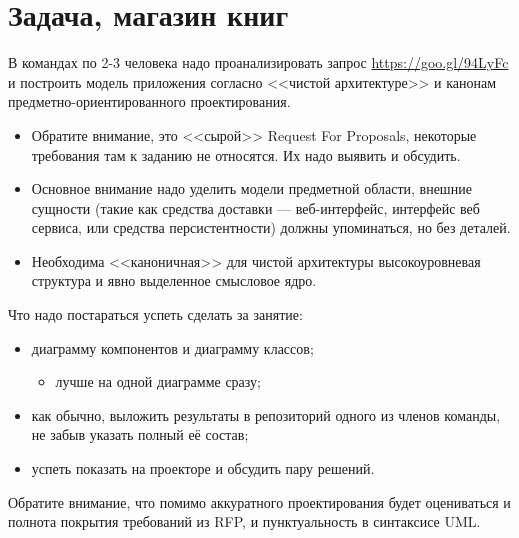 \documentclass{../../text-style}
\begin{document}
\maketitle
\thispagestyle{empty}

\section{Задача, магазин книг}

В командах по 2-3 человека надо проанализировать запрос \url{ https://goo.gl/94LyFc} и построить модель приложения согласно <<чистой архитектуре>> и канонам предметно-ориентированного проектирования.

\begin{itemize}
    \item Обратите внимание, это <<сырой>> Request For Proposals, некоторые требования там к заданию не относятся. Их надо выявить и обсудить.
    \item Основное внимание надо уделить модели предметной области, внешние сущности (такие как средства доставки --- веб-интерфейс, интерфейс веб сервиса, или средства персистентности) должны упоминаться, но без деталей.
    \item Необходима <<каноничная>> для чистой архитектуры высокоуровневая структура и явно выделенное смысловое ядро.
\end{itemize}

Что надо постараться успеть сделать за занятие:

\begin{itemize}
    \item диаграмму компонентов и диаграмму классов;
    \begin{itemize}
        \item лучше на одной диаграмме сразу;
    \end{itemize}
    \item как обычно, выложить результаты в репозиторий одного из членов команды, не забыв указать полный её состав;
    \item успеть показать на проекторе и обсудить пару решений.
\end{itemize}

Обратите внимание, что помимо аккуратного проектирования будет оцениваться и полнота покрытия требований из RFP, и пунктуальность в синтаксисе UML.
\end{document}
